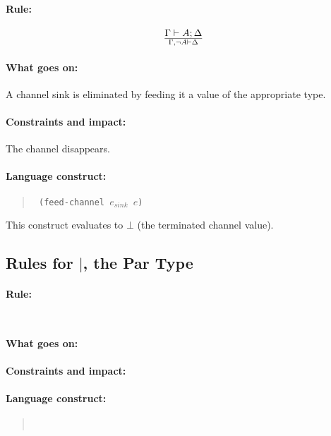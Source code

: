 \documentclass[a4paper]{article}
\begin{document}
\paragraph{Rule:}
$$
{
  \Gamma \vdash A; \Delta
}\over{
  \Gamma, \lnot A \vdash \Delta
}
$$

\paragraph{What goes on:} A channel sink is eliminated by feeding it
a value of the appropriate type.

\paragraph{Constraints and impact:} The channel disappears.

\paragraph{Language construct:}
\begin{quote}\tt
  (feed-channel $e_{sink}$ $e$)
\end{quote}
This construct evaluates to $\bot$ (the terminated channel value).


\subsection{Rules for $|$, the Par Type}

\paragraph{Rule:}
$$
{
}\over{
}
$$
\paragraph{What goes on:}
\paragraph{Constraints and impact:}
\paragraph{Language construct:}
\begin{quote}\tt
\end{quote}




\end{document}
